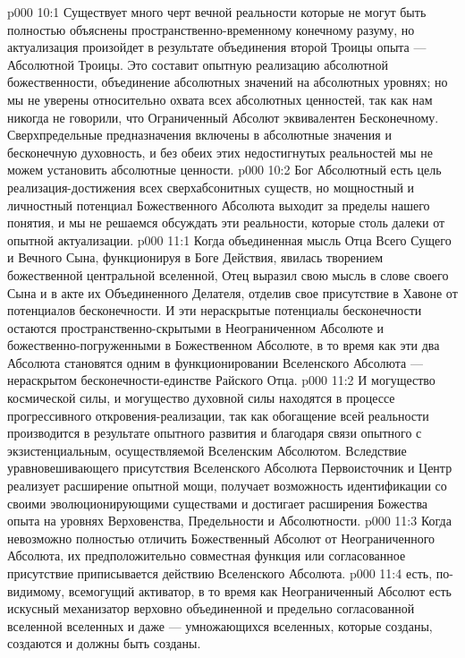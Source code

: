 \vs p000 10:1 Существует много черт вечной реальности  которые не могут быть полностью объяснены пространственно\hyp{}временному конечному разуму, но актуализация  произойдет в результате объединения второй Троицы опыта --- Абсолютной Троицы. Это составит опытную реализацию абсолютной божественности, объединение абсолютных значений на абсолютных уровнях; но мы не уверены относительно охвата всех абсолютных ценностей, так как нам никогда не говорили, что Ограниченный Абсолют эквивалентен Бесконечному. Сверхпредельные предназначения включены в абсолютные значения и бесконечную духовность, и без обеих этих недостигнутых реальностей мы не можем установить абсолютные ценности.
\vs p000 10:2 Бог Абсолютный есть цель реализация\hyp{}достижения всех сверхабсонитных существ, но мощностный и личностный потенциал Божественного Абсолюта выходит за пределы нашего понятия, и мы не решаемся обсуждать эти реальности, которые столь далеки от опытной актуализации.
\vs p000 11:1 Когда объединенная мысль Отца Всего Сущего и Вечного Сына, функционируя в Боге Действия, явилась творением божественной центральной вселенной, Отец выразил свою мысль в слове своего Сына и в акте их Объединенного Делателя, отделив свое присутствие в Хавоне от потенциалов бесконечности. И эти нераскрытые потенциалы бесконечности остаются пространственно\hyp{}скрытыми в Неограниченном Абсолюте и божественно\hyp{}погруженными в Божественном Абсолюте, в то время как эти два Абсолюта становятся одним в функционировании Вселенского Абсолюта --- нераскрытом бесконечности\hyp{}единстве Райского Отца.
\vs p000 11:2 И могущество космической силы, и могущество духовной силы находятся в процессе прогрессивного откровения\hyp{}реализации, так как обогащение всей реальности производится в результате опытного развития и благодаря связи опытного с экзистенциальным, осуществляемой Вселенским Абсолютом. Вследствие уравновешивающего присутствия Вселенского Абсолюта Первоисточник и Центр реализует расширение опытной мощи, получает возможность идентификации со своими эволюционирующими существами и достигает расширения Божества опыта на уровнях Верховенства, Предельности и Абсолютности.
\vs p000 11:3 \pc Когда невозможно полностью отличить Божественный Абсолют от Неограниченного Абсолюта, их предположительно совместная функция или согласованное присутствие приписывается действию Вселенского Абсолюта.
\vs p000 11:4 \bibnobreakspace {} есть, по\hyp{}видимому, всемогущий активатор, в то время как Неограниченный Абсолют есть искусный механизатор верховно объединенной и предельно согласованной вселенной вселенных и даже --- умножающихся вселенных, которые созданы, создаются и должны быть созданы.
